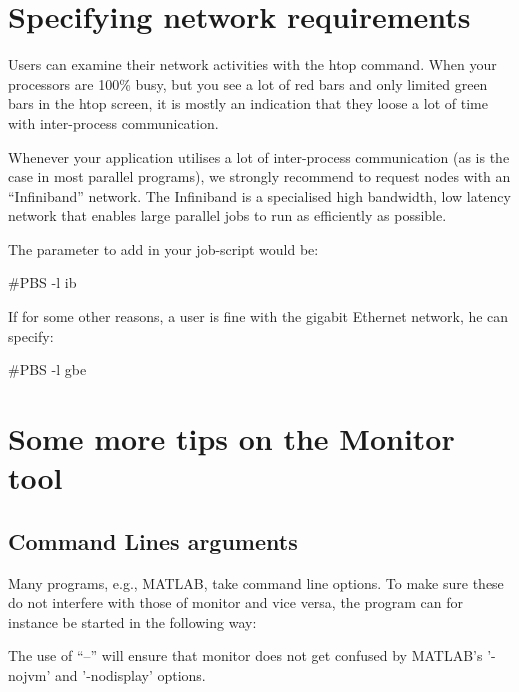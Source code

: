 \section{Specifying network requirements}

Users can examine their network activities with the htop command. When your
processors are 100\% busy, but you see a lot of red bars and only limited green
bars in the htop screen, it is mostly an indication that they loose a lot of
time with inter-process communication.

Whenever your application utilises a lot of inter-process communication (as is
the case in most parallel programs), we strongly recommend to request nodes
with an ``Infiniband'' network. The Infiniband is a specialised high bandwidth,
low latency network that enables large parallel jobs to run as efficiently as
possible.

The parameter to add in your job-script would be:

\begin{prompt}
#PBS -l ib
\end{prompt}

If for some other reasons, a user is fine with the gigabit Ethernet network, he
can specify:

\begin{prompt}
#PBS -l gbe
\end{prompt}

\ifgent
\else
  \section{Some more tips on the Monitor tool}

  \subsection{Command Lines arguments}

  Many programs, e.g., MATLAB, take command line options. To make sure these do
  not interfere with those of monitor and vice versa, the program can for
  instance be started in the following way:

\begin{prompt}
\end{prompt}

  The use of ``--'' will ensure that monitor does not get confused by MATLAB's '-nojvm' and '-nodisplay' options.

